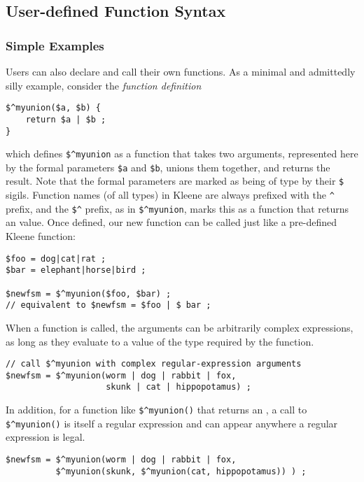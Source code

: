 \subsection{User-defined Function Syntax}

\subsubsection{Simple Examples}

Users can also declare and call their own functions.  As a minimal and admittedly silly example, consider the
\emph{function definition}

\begin{Verbatim}
$^myunion($a, $b) {
    return $a | $b ;
}
\end{Verbatim}

\noindent
which defines \verb!$^myunion! as a function that takes two \fsm{} arguments, represented here by the formal
parameters \verb!$a! and \verb!$b!, unions them together, and returns the \fsm{} result.  Note that the formal
parameters are marked as being of type \fsm{} by their \verb!$! sigils.  Function names (of all types) 
in Kleene are always
prefixed with the \verb!^! prefix, and the \verb!$^! prefix, as in \verb!$^myunion!, marks this as a function
that
returns an \fsm{} value.  Once defined, our new function can be called just like a pre-defined Kleene function:

\begin{Verbatim}
$foo = dog|cat|rat ;
$bar = elephant|horse|bird ;

$newfsm = $^myunion($foo, $bar) ;
// equivalent to $newfsm = $foo | $ bar ;
\end{Verbatim}

\noindent
When a function is called, the arguments can be arbitrarily complex expressions, as long as they evaluate to a
value of the type required by the function.

\begin{Verbatim}
// call $^myunion with complex regular-expression arguments
$newfsm = $^myunion(worm | dog | rabbit | fox, 
                    skunk | cat | hippopotamus) ;
\end{Verbatim}

\noindent
In addition, for a function like \verb!$^myunion()! that returns an \fsm{}, a call to \verb!$^myunion()! is
itself a regular expression and can appear anywhere a regular expression is legal.

\begin{Verbatim}
$newfsm = $^myunion(worm | dog | rabbit | fox, 
          $^myunion(skunk, $^myunion(cat, hippopotamus)) ) ;
\end{Verbatim}

